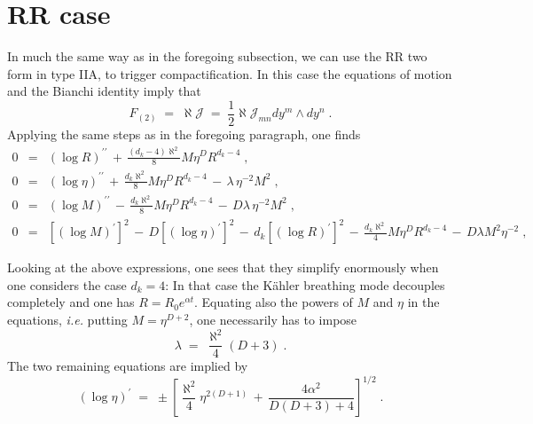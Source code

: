 \documentclass[a4paper,11pt]{article}
\begin{document}
\section{RR case}
\label{sec:RR2}
In much the same way as in the foregoing subsection, we can use the
RR two form in type IIA, to trigger compactification. In this case
the equations of motion and the Bianchi identity imply that 
\begin{equation}
 F_{(2)} \;=\; \aleph \mathcal{J} 
         \;=\; \textstyle{\frac{1}{2}} \aleph
               \mathcal{J}_{mn} dy^{m}\wedge dy^{n} \; .
\label{eq:F2Ansatz}
\end{equation}
Applying the same steps as in the foregoing paragraph, one finds
\begin{eqnarray}
0 &=&  \left(\log R\right)^{\prime\prime}
       \,+\, \textstyle{\frac{(d_{k}-4)\aleph^{2}}{8}}
             M\eta^{D}R^{d_{k}-4} \; ,\\
0 &=&  \left(\log \eta\right)^{\prime\prime}
       \,+\, \textstyle{\frac{d_{k}\aleph^{2}}{8}}
             M\eta^{D}R^{d_{k}-4}
       \,-\, \lambda\, \eta^{-2}M^{2} \; , \\
0 &=&  \left(\log M\right)^{\prime\prime}
       \,-\, \textstyle{\frac{d_{k}\aleph^{2}}{8}}
             M\eta^{D}R^{d_{k}-4}
       \,-\, D\lambda\, \eta^{-2}M^{2} \; ,  \\
0 &=& \left[ \left(\log M\right)^{\prime}\right]^{2}
      \,-\, D \left[ \left(\log \eta\right)^{\prime}\right]^{2}
      \,-\, d_{k}\left[ \left(\log R\right)^{\prime}\right]^{2}
      \,-\, \textstyle{\frac{d_{k}\aleph^{2}}{4}}M\eta^{D}R^{d_{k}-4}
      \,-\, D\lambda M^{2}\eta^{-2}
      \; ,
\label{eq:F2eqs}
\end{eqnarray}
\par
Looking at the above expressions, one sees that they simplify enormously
when one considers the case $d_{k}=4$:
In that case the K\"ahler breathing mode
decouples completely and one has $R=R_{0}e^{\alpha t}$. Equating also the 
powers of $M$ and $\eta$ in the equations, {\em i.e.} putting $M=\eta^{D+2}$,
one necessarily has to impose
\begin{equation}
\lambda \;=\; \frac{\aleph^{2}}{4}\left( D+3 \right) \; .
\end{equation}
The two remaining equations are implied by 
\begin{equation}
\left(\log \eta\right)^{\prime} \;=\; \pm
           \left[
               \frac{\aleph^{2}}{4} \eta^{2(D+1)}\,+\, 
                \frac{4\alpha^{2}}{D(D+3)+4}
           \right]^{1/2} \; .
\end{equation}
\end{document}
